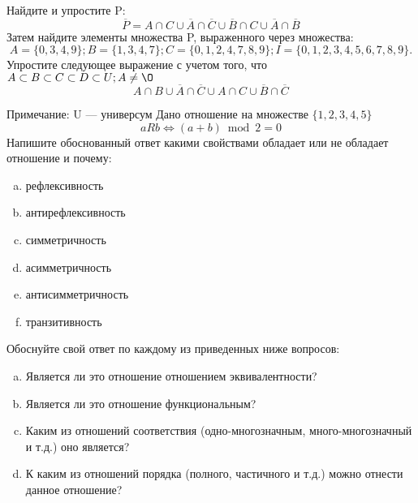 \documentclass[10pt]{exam}
\begin{document}
\begin{questions}
\question
Найдите и упростите P:
\begin{equation*}
\overline{P} = A \cap C \cup \overline{A} \cap \overline{C} \cup \overline{B} \cap C \cup \overline{A} \cap \overline{B}
\end{equation*}
Затем найдите элементы множества P, выраженного через множества:
\begin{equation*}
A = \{0, 3, 4, 9\}; 
B = \{1, 3, 4, 7\};
C = \{0, 1, 2, 4, 7, 8, 9\};
I = \{0, 1, 2, 3, 4, 5, 6, 7, 8, 9\}.
\end{equation*}\question
Упростите следующее выражение с учетом того, что $A\subset B \subset C \subset D \subset U; A \neq \O$
\begin{equation*}
A \cap B \cup \overline{A} \cap \overline{C} \cup A \cap C \cup \overline{B} \cap \overline{C}
\end{equation*}

Примечание: U — универсум\question
Дано отношение на множестве $\{1, 2, 3, 4, 5\}$ 
\begin{equation*}
aRb \iff (a+b) \bmod 2 =0
\end{equation*}
Напишите обоснованный ответ какими свойствами обладает или не обладает отношение и почему:   
\begin{enumerate} [a)]\setcounter{enumi}{0}
\item рефлексивность
\item антирефлексивность
\item симметричность
\item асимметричность
\item антисимметричность
\item транзитивность
\end{enumerate}

Обоснуйте свой ответ по каждому из приведенных ниже вопросов:
\begin{enumerate} [a)]\setcounter{enumi}{0}
    \item Является ли это отношение отношением эквивалентности?
    \item Является ли это отношение функциональным?
    \item Каким из отношений соответствия (одно-многозначным, много-многозначный и т.д.) оно является?
    \item К каким из отношений порядка (полного, частичного и т.д.) можно отнести данное отношение?
\end{enumerate}




\end{questions}
\end{document}
